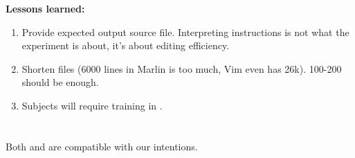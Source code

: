 \textbf{Lessons learned:}
\begin{enumerate}
    \item Provide expected output source file. Interpreting instructions is not what the experiment is about, it's about editing efficiency.
    \item Shorten files (6000 lines in Marlin is too much, Vim even has 26k). 100-200 should be enough.
    \item Subjects will require training in \tooln.
\end{enumerate}


\section{\RQA}
Both \cite{neves2011evolution} and \cite{passos2016coevolution} are compatible with our intentions.

\section{\RQB}

\section{\RQC}

